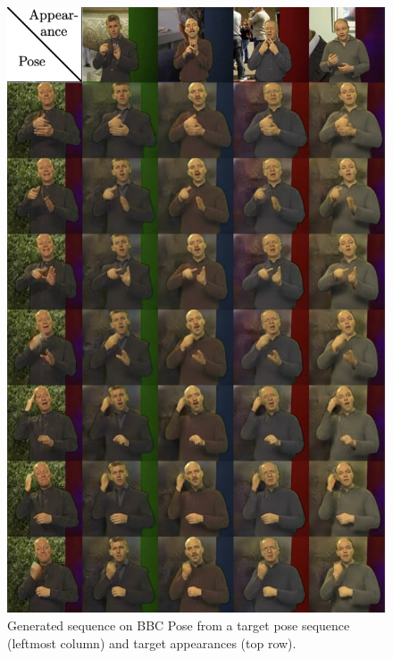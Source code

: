 \begin{figure}[b!]
	\centering
	\centering
	\includegraphics[trim={0cm 0cm 0cm 0cm},clip, width=.8\linewidth]{fig/supp/bbc}
	\caption{Generated sequence on BBC Pose from a target pose sequence (leftmost column) and target appearances (top row). }
	\label{fig:bbc1}
\end{figure}


